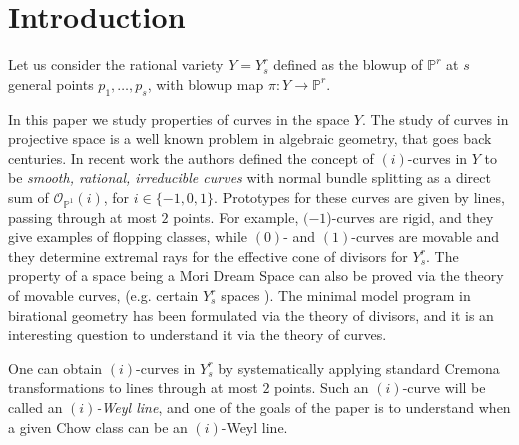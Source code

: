 \documentclass[12pt]{article}
\numberwithin{equation}{section}
\numberwithin{equation}{section}
\numberwithin{subeq}{equation}
\def\bbP{\mathbb{P}}
\begin{document}
\begin{abstract}
We investigate the study of smooth irreducible rational curves
in $Y_s^r$, a general blowup of $\bbP^r$ at $s$ general points, whose normal bundle splits as a direct sum of line bundles all of degree $i$,
for $i \in \{-1,0,1\}$: we call these \emph{$(i)$-curves}.
We systematically exploit the theory of Coxeter groups
applied to the Chow space of curves in $Y_s^r$,
which provides us with a useful bilinear form that helps to expose properties of $(i)$-curves.
We are particularly interested in the orbits of lines (through $1-i$ points)
under the Weyl group of standard Cremona transformations (all of which are $(i)$-curves):
we call these \emph{$(i)$-Weyl lines}.
We prove various theorems related to understanding
when an $(i)$-curve is an $(i)$-Weyl line,
via numerical criteria expressed in terms of the bilinear form.
We obtain stronger results for $r=3$,
where we prove a Noether-type inequality that gives a sharp criterion.
\end{abstract}

\tableofcontents

\section{Introduction}
Let us consider the rational variety $Y=Y_s^r$
defined as the blowup of $\bbP^r$ at $s$ general points $p_1,\ldots,p_s$,
with blowup map $\pi:Y \to \bbP^r$.

In this paper we study properties of curves in the space $Y$.
The study of curves in projective space
is a well known problem in algebraic geometry,
that goes back centuries.
In recent work \cite{DM2}
the authors defined the concept of $(i)$-curves in $Y$
to be \emph{smooth, rational, irreducible curves}
with normal bundle splitting as a direct sum of
$\mathcal{O}_{\mathbb{P}^1} (i)$,
for $i\in \{-1, 0, 1\}$.
Prototypes for these curves are given by lines, passing through at most $2$ points.
For example, $(-1$)-curves are rigid,
and they give examples of flopping classes,
while $(0)$- and $(1)$-curves are movable
and they determine extremal rays
for the effective cone of divisors for $Y_s^r$.
The property of a space being a Mori Dream Space
can also be proved via the theory of movable curves,
(e.g. certain $Y_s^r$ spaces \cite{DM2}).
The minimal model program in birational geometry
has been formulated via the theory of divisors,
and it is an interesting question
to understand it via the theory of curves.

One can obtain $(i)$-curves in $Y_s^r$
by systematically applying standard Cremona transformations to lines through at most $2$ points.
Such an $(i)$-curve will be called an \emph{$(i)$-Weyl line},
and one of the goals of the paper is to understand when a given Chow class
can be an $(i)$-Weyl line.
\end{document}
